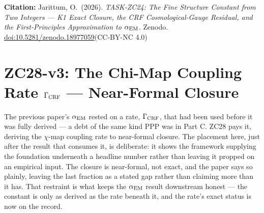 \documentclass[12pt, a4paper]{article}
\begin{document}
\bigskip
\begin{center}
\textbf{Citation:} Jarittum, O.\ (2026).
\textit{TASK-ZC24: The Fine Structure Constant from Two Integers ---
K1 Exact Closure, the CRF Cosmological-Gauge Residual,
and the First-Principles Approximation to $\alpha_{\rm EM}$.}
Zenodo. \href{https://doi.org/10.5281/zenodo.18977059}%
{doi:10.5281/zenodo.18977059}\quad (CC-BY-NC 4.0)
\end{center}

\bigskip


\section{ZC28-v3: The Chi-Map Coupling Rate $\Gamma_{\rm CRF}$ --- Near-Formal Closure}
\label{sec:zc28-gamma-chi}

The previous paper's $\alpha_{\rm EM}$ rested on a rate, $\Gamma_{\rm CRF}$, that
had been used before it was fully derived --- a debt of the same kind PPP was in
Part C. ZC28 pays it, deriving the $\chi$-map coupling rate to near-formal
closure. The placement here, just after the result that consumes it, is
deliberate: it shows the framework supplying the foundation underneath a headline
number rather than leaving it propped on an empirical input. The closure is
near-formal, not exact, and the paper says so plainly, leaving the last fraction
as a stated gap rather than claiming more than it has. That restraint is what
keeps the $\alpha_{\rm EM}$ result downstream honest --- the constant is only as
derived as the rate beneath it, and the rate's exact status is now on the record.
\end{document}
